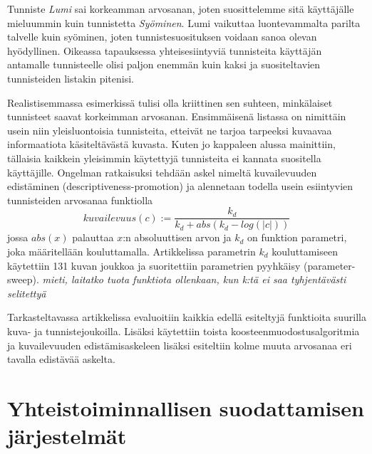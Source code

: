 \documentclass[12pt,finnish]{tktltiki2}
\theoremstyle{definition}
\theoremstyle{remark}
\begin{document}
Tunniste \textit{Lumi} sai korkeamman arvosanan, joten suosittelemme sitä käyttäjälle mieluummin kuin tunnistetta \textit{Syöminen}. Lumi vaikuttaa luontevammalta parilta talvelle kuin syöminen, joten tunnistesuosituksen voidaan sanoa olevan hyödyllinen. Oikeassa tapauksessa yhteisesiintyviä tunnisteita käyttäjän antamalle tunnisteelle olisi paljon enemmän kuin kaksi ja suositeltavien tunnisteiden listakin pitenisi.

Realistisemmassa esimerkissä tulisi olla kriittinen sen suhteen, minkälaiset tunnisteet saavat korkeimman arvosanan. Ensimmäisenä listassa on nimittäin usein niin yleisluontoisia tunnisteita, etteivät ne tarjoa tarpeeksi kuvaavaa informaatiota käsiteltävästä kuvasta. Kuten jo kappaleen alussa mainittiin, tällaisia kaikkein yleisimmin käytettyjä tunnisteita ei kannata suositella käyttäjille. Ongelman ratkaisuksi tehdään askel nimeltä kuvailevuuden edistäminen (descriptiveness-promotion) ja alennetaan todella usein esiintyvien tunnisteiden arvosanaa funktiolla
\begin{displaymath}
kuvailevuus(c) := \frac{k_d}{k_d + abs(k_d -log(|c|))}
\end{displaymath}
jossa $abs(x)$ palauttaa $x$:n absoluuttisen arvon ja $k_d$ on funktion parametri, joka määritellään kouluttamalla. Artikkelissa parametrin $k_d$ kouluttamiseen käytettiin 131 kuvan joukkoa ja suoritettiin parametrien pyyhkäisy (parameter-sweep).
\textit{mieti, laitatko tuota funktiota ollenkaan, kun k:tä ei saa tyhjentävästi selitettyä}

Tarkasteltavassa artikkelissa evaluoitiin kaikkia edellä esiteltyjä funktioita suurilla kuva- ja tunnistejoukoilla. Lisäksi käytettiin toista koosteenmuodostusalgoritmia ja kuvailevuuden edistämisaskeleen lisäksi esiteltiin kolme muuta arvosanaa eri tavalla edistävää askelta. \cite{Sigurbjornsson:2008:FTR:1367497.1367542}



\section{Yhteistoiminnallisen suodattamisen järjestelmät}
\end{document}
